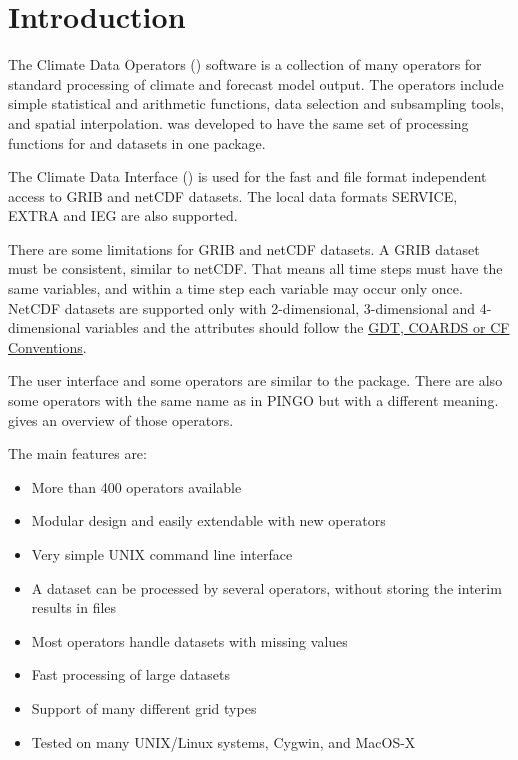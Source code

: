 \chapter{Introduction}

The Climate Data Operators ({\CDO}) software is a collection of many operators
for standard processing of climate and forecast model output.
The operators include simple statistical and arithmetic functions, data selection
and subsampling tools, and spatial interpolation.
{\CDO} was developed to have the same set of processing functions for  and 
datasets in one package.

The Climate Data Interface () is used for the fast and file format
independent access to GRIB and netCDF datasets.
The local data formats SERVICE, EXTRA and IEG are also supported.

There are some limitations for GRIB and netCDF datasets.
A GRIB dataset must be consistent, similar to netCDF.
That means all time steps must have the same variables, and
within a time step each variable may occur only once.
NetCDF datasets are supported only with 2-dimensional, 3-dimensional and 4-dimensional
variables and the attributes should follow the
\href{http://ftp.unidata.ucar.edu/software/netcdf/docs/conventions.html}
     {GDT, COARDS or CF Conventions}.

The user interface and some operators are similar to the  package.
There are also some operators with the same name as in PINGO but with a 
different meaning.  gives an overview of 
those operators.

The main {\CDO} features are:
\begin{itemize}
\item More than 400 operators available
\item Modular design and easily extendable with new operators
\item Very simple UNIX command line interface
\item A dataset can be processed by several operators,
      without storing the interim results in files %
\item Most operators handle datasets with missing values
\item Fast processing of large datasets
\item Support of many different grid types
\item Tested on many UNIX/Linux systems, Cygwin, and MacOS-X
\end{itemize}














